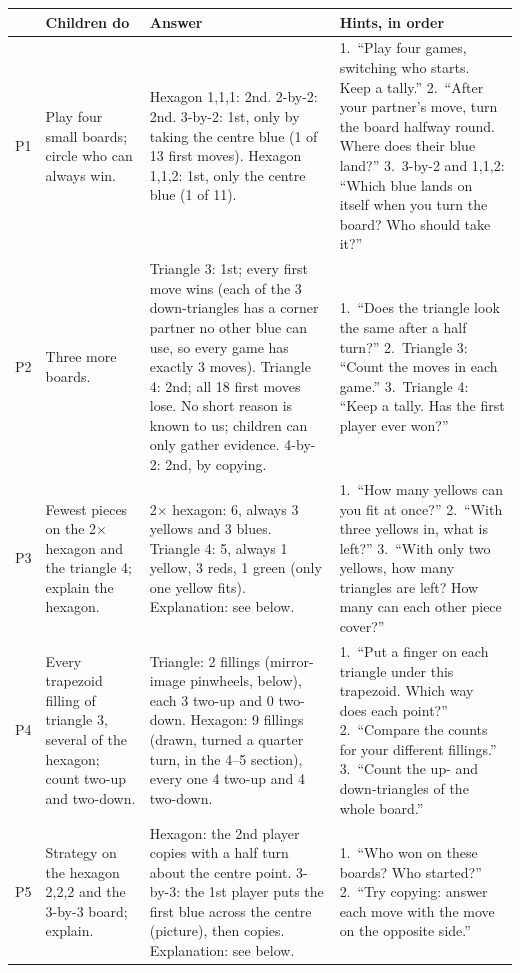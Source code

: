 \documentclass[10pt]{article}
\newcommand{\core}{\newline{\footnotesize core}}
\newcommand{\more}{\newline{\footnotesize further}}
\begin{document}
{\small
\begin{xltabular}{\linewidth}{L{0.42in} L{1.45in} Y Y}
\toprule
& \textbf{Children do} & \textbf{Answer} & \textbf{Hints, in order}\\
\midrule
P1\core & Play four small boards; circle who can always win. &
Hexagon 1,1,1: 2nd. 2-by-2: 2nd. 3-by-2: 1st, only by taking the centre blue (1 of 13 first moves). Hexagon 1,1,2: 1st, only the centre blue (1 of 11). &
1.~``Play four games, switching who starts. Keep a tally.''
2.~``After your partner's move, turn the board halfway round. Where does their blue land?''
3.~3-by-2 and 1,1,2: ``Which blue lands on itself when you turn the board? Who should take it?''\\
P2\core & Three more boards. &
Triangle 3: 1st; every first move wins (each of the 3 down-triangles has a corner partner no other blue can use, so every game has exactly 3 moves).
Triangle 4: 2nd; all 18 first moves lose. No short reason is known to us; children can only gather evidence.
4-by-2: 2nd, by copying. &
1.~``Does the triangle look the same after a half turn?''
2.~Triangle 3: ``Count the moves in each game.''
3.~Triangle 4: ``Keep a tally. Has the first player ever won?''\\
P3\core & Fewest pieces on the 2$\times$ hexagon and the triangle 4; explain the hexagon. &
2$\times$ hexagon: 6, always 3 yellows and 3 blues. Triangle 4: 5, always 1 yellow, 3 reds, 1 green (only one yellow fits).
Explanation: see below. &
1.~``How many yellows can you fit at once?''
2.~``With three yellows in, what is left?''
3.~``With only two yellows, how many triangles are left? How many can each other piece cover?''\\
P4\core & Every trapezoid filling of triangle 3, several of the hexagon; count two-up and two-down. &
Triangle: 2 fillings (mirror-image pinwheels, below), each 3 two-up and 0 two-down.
Hexagon: 9 fillings (drawn, turned a quarter turn, in the 4--5 section), every one 4 two-up and 4 two-down. &
1.~``Put a finger on each triangle under this trapezoid. Which way does each point?''
2.~``Compare the counts for your different fillings.''
3.~``Count the up- and down-triangles of the whole board.''\\
P5\more & Strategy on the hexagon 2,2,2 and the 3-by-3 board; explain. &
Hexagon: the 2nd player copies with a half turn about the centre point.
3-by-3: the 1st player puts the first blue across the centre (picture), then copies.
Explanation: see below. &
1.~``Who won on these boards? Who started?''
2.~``Try copying: answer each move with the move on the opposite side.''

\end{xltabular}}
\end{document}

